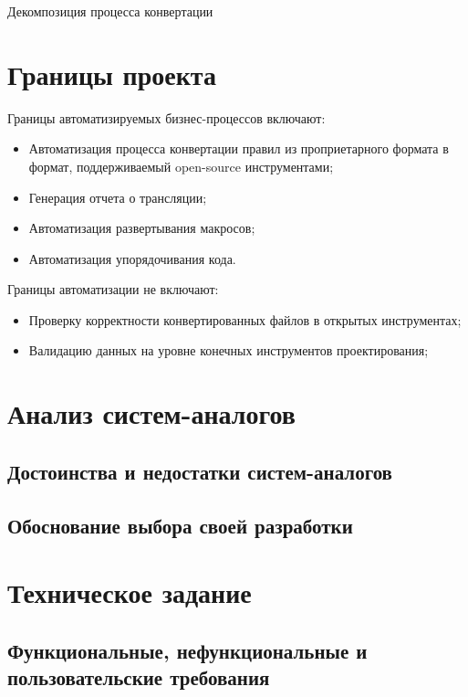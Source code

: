 \begin{image}
	\caption{Декомпозиция процесса конвертации}
	\label{fig:idef0:a4}
\end{image}

\section{Границы проекта}

Границы автоматизируемых бизнес-процессов включают:

\begin{itemize}
	\item Автоматизация процесса конвертации правил
		из проприетарного формата в формат,
		поддерживаемый open-source инструментами;
	\item Генерация отчета о трансляции;
	\item Автоматизация развертывания макросов;
	\item Автоматизация упорядочивания кода.
\end{itemize}

Границы автоматизации не включают:

\begin{itemize}
	\item Проверку корректности конвертированных файлов
		в открытых инструментах;
	\item Валидацию данных на уровне конечных инструментов проектирования;
\end{itemize}

\section{Анализ систем-аналогов}

\subsection{Достоинства и недостатки систем-аналогов}
\subsection{Обоснование выбора своей разработки}

\section{Техническое задание}

\subsection{Функциональные, нефункциональные и пользовательские требования}

